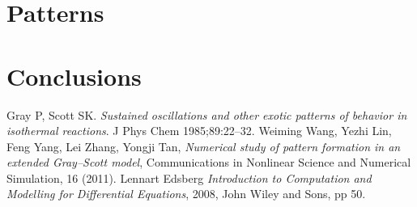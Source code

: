 \documentclass[a4paper,11pt]{article}
\begin{document}
\section*{Patterns}
\section*{Conclusions}

\clearpage
\begin{thebibliography}{}
 Gray P, Scott SK. {\it Sustained oscillations and other exotic patterns of behavior in isothermal reactions}. J Phys Chem 1985;89:22–32.
 Weiming Wang, Yezhi Lin, Feng Yang, Lei Zhang, Yongji Tan, {\it Numerical study of pattern formation in an extended Gray–Scott model}, Communications in Nonlinear Science and Numerical Simulation, 16 (2011).
 Lennart Edsberg {\it Introduction to Computation and Modelling for Differential Equations}, 2008, John Wiley and Sons, pp 50.
\end{thebibliography}
\end{document}
